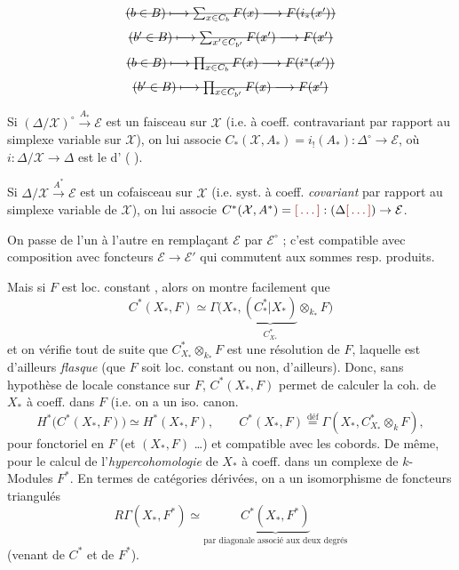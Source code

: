 \documentclass[11pt,a4paper]{article}
\begin{document}


\[
  \text{\struck{$(b \in B) \longmapsto \sum_{x \in C_b} F(x) \longrightarrow F(i_*(x'))$}}
\]
\[
  \text{\struck{$(b' \in B) \longmapsto \sum_{x' \in C_{b'}} F(x') \longrightarrow F(x')$}}
\]
\[
  \text{\struck{$(b \in B) \longmapsto \prod_{x \in C_b} F(x) \longrightarrow F(i^*(x'))$}}
\]
\[
  \text{\struck{$(b' \in B) \longmapsto \prod_{x \in C_{b'}} F(x) \longrightarrow F(x')$}}
\]

Si $(\Delta/\mathcal{X})^{\circ} \xrightarrow{A_*} \mathcal{E}$ \struck{\ill{}} est un faisceau sur
$\mathcal{X}$ (i.e.   à coeff. contravariant par rapport au
simplexe variable sur $\mathcal{X}$), on lui associe $C_*(\mathcal{X}, A_*) = i_!(A_*) :
\Delta^{\circ} \to \mathcal{E}$, où $i : \Delta/\mathcal{X} \to \Delta$ est le
 d' ( ).

Si $\Delta/\mathcal{X} \xrightarrow{A^*} \mathcal{E}$ \struck{\ill{}} est un \og cofaisceau \fg{}
sur $\mathcal{X}$ (i.e. syst. à coeff. \emph{covariant} par rapport au simplexe variable de
$\mathcal{X}$), on lui associe $C^*(\mathcal{X}, A^*) = \ill{} : (\Delta \ill{}) \to \mathcal{E}$.

On passe de l'un à l'autre en remplaçant $\mathcal{E}$ par $\mathcal{E}^{\circ}$ ; c'est
compatible avec composition avec foncteurs $\mathcal{E} \to \mathcal{E}'$ qui commutent aux
sommes resp. produits.

Mais si $F$  est loc. constant , alors on montre
facilement que
\[
  C^*(X_*, F) \simeq \Gamma\bigl(X_*, \underbrace{(C^*_*|X_*)}_{C^*_{X_*}} \otimes_{k_*} F\bigr)
\]
et on vérifie tout de suite que $C^*_{X_*} \otimes_{k_*} F$ est une résolution de $F$,
laquelle est d'ailleurs \emph{flasque}  (que $F$ soit loc.
constant ou non, d'ailleurs). Donc, sans hypothèse de locale constance sur $F$,
$C^*(X_*, F)$ permet de calculer la coh. de $X_*$ à coeff. dans $F$ (i.e. on a un iso.
canon.
\[
  H^*\bigl(C^*(X_*, F)\bigr) \simeq H^*(X_*, F),
  \qquad
  C^*(X_*, F) \overset{\text{déf}}{=} \Gamma(X_*, C^*_{X_*} \otimes_k F),
\]
pour  fonctoriel en $F$ (et \ill{} $(X_*, F)$ \ldots) et compatible
avec les cobords. De même, pour le calcul de l'\emph{hypercohomologie} de $X_*$ à coeff.
dans un complexe de $k$-Modules $F^*$. En termes de catégories dérivées, on a un
isomorphisme de foncteurs triangulés
\[
  R\Gamma(X_*, F^*) \simeq \underbrace{C^*(X_*, F^*)}_{\text{par diagonale associé aux deux degrés}}
\]
(venant de $C^*$ et de $F^*$).
\end{document}
